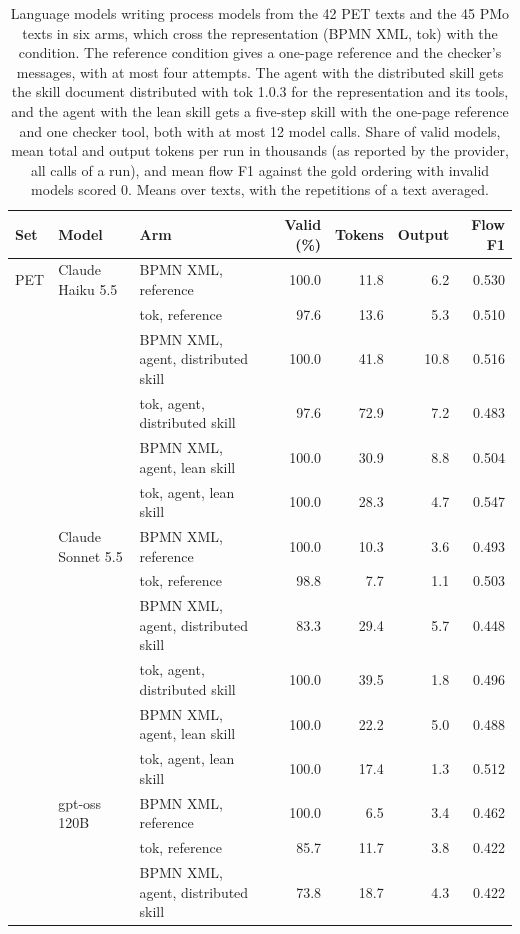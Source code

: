 \documentclass[11pt,a4paper]{article}
\begin{document}
\begin{table}[tp]
\centering
\footnotesize
\caption{Language models writing process models from the 42 PET texts and the 45 PMo texts in six arms, which cross the representation (BPMN XML, tok) with the condition. The reference condition gives a one-page reference and the checker's messages, with at most four attempts. The agent with the distributed skill gets the skill document distributed with tok 1.0.3 for the representation and its tools, and the agent with the lean skill gets a five-step skill with the one-page reference and one checker tool, both with at most 12 model calls. Share of valid models, mean total and output tokens per run in thousands (as reported by the provider, all calls of a run), and mean flow F1 against the gold ordering with invalid models scored 0. Means over texts, with the repetitions of a text averaged.}\label{tab:models}
\begin{tabular}{@{}l l l r r r r@{}}
\toprule
Set & Model & Arm & Valid (\%) & Tokens & Output & Flow F1\\
\midrule
PET & Claude Haiku 5.5 & BPMN XML, reference & 100.0 & 11.8 & 6.2 & 0.530\\
 &  & tok, reference & 97.6 & 13.6 & 5.3 & 0.510\\
 &  & BPMN XML, agent, distributed skill & 100.0 & 41.8 & 10.8 & 0.516\\
 &  & tok, agent, distributed skill & 97.6 & 72.9 & 7.2 & 0.483\\
 &  & BPMN XML, agent, lean skill & 100.0 & 30.9 & 8.8 & 0.504\\
 &  & tok, agent, lean skill & 100.0 & 28.3 & 4.7 & 0.547\\
\addlinespace
 & Claude Sonnet 5.5 & BPMN XML, reference & 100.0 & 10.3 & 3.6 & 0.493\\
 &  & tok, reference & 98.8 & 7.7 & 1.1 & 0.503\\
 &  & BPMN XML, agent, distributed skill & 83.3 & 29.4 & 5.7 & 0.448\\
 &  & tok, agent, distributed skill & 100.0 & 39.5 & 1.8 & 0.496\\
 &  & BPMN XML, agent, lean skill & 100.0 & 22.2 & 5.0 & 0.488\\
 &  & tok, agent, lean skill & 100.0 & 17.4 & 1.3 & 0.512\\
\addlinespace
 & gpt-oss 120B & BPMN XML, reference & 100.0 & 6.5 & 3.4 & 0.462\\
 &  & tok, reference & 85.7 & 11.7 & 3.8 & 0.422\\
 &  & BPMN XML, agent, distributed skill & 73.8 & 18.7 & 4.3 & 0.422\\

\end{tabular}
\end{table}
\end{document}

